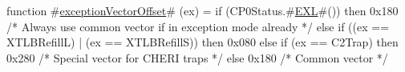 function #\hyperref[zexceptionVectorOffset]{exceptionVectorOffset}# (ex) = 
  if (CP0Status.#\hyperref[zEXL]{EXL}#()) then
    0x180 /* Always use common vector if in exception mode already */
  else if ((ex == XTLBRefillL) | (ex == XTLBRefillS)) then 
    0x080
  else if (ex == C2Trap) then
    0x280 /* Special vector for CHERI traps */
  else
    0x180 /* Common vector */
